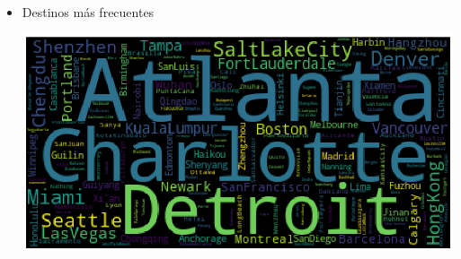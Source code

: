 \documentclass[a4paper,11pt]{article}
\begin{document}
\begin{itemize}
\begin{center}
\end{center}
\item Destinos más frecuentes
\begin{center}
\includegraphics[scale=0.25]{./imagenes/wordcloud.png}
\end{center}
\end{itemize}
\end{document}
